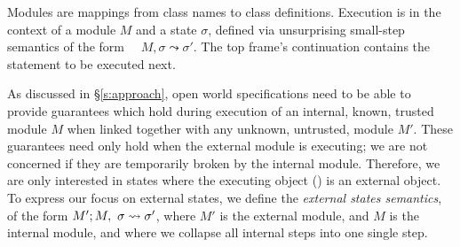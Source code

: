 Modules are mappings
from class names to class definitions. 
Execution 
is in the context of  a module $M$ and   a state $\sigma$,
 defined via unsurprising small-step semantics of the form \ \ 
   $M, \sigma \leadsto \sigma'$.
The   top frame's continuation contains the statement to be %
executed next.
 
As discussed in \S \ref{s:approach}, %
{open world specifications need to be able to provide}
guarantees which hold
during execution of an internal, 
known, trusted module $M$ when linked together with any
unknown, untrusted, module $M'$. These guarantees need only hold 
when the external module is executing; we are not concerned if they are
temporarily broken by the internal module. Therefore, we are only interested in states where the
executing object (\prg{this}) is an external object. 
To express our focus on external states, we define the  \emph{external states semantics}, of the form 
$M' ; M,\ \sigma \leadsto \sigma'$, where $M'$ is the external
module, and $M$ is the internal module, and where we
collapse all internal steps into one single step.

 

